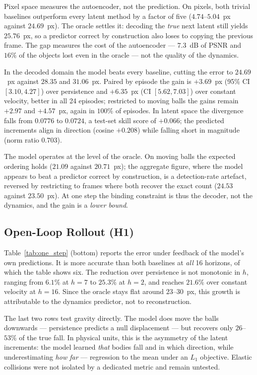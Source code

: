 \documentclass[conference]{IEEEtran}
\begin{document}
Pixel space measures the autoencoder, not the prediction. On pixels, both trivial baselines outperform every latent method by a factor of five ($4.74$--$5.04$~px against $24.69$~px). The oracle settles it: decoding the \emph{true} next latent still yields $25.76$~px, so a predictor correct by construction also loses to copying the previous frame. The gap measures the cost of the autoencoder --- $7.3$~dB of PSNR and $16\%$ of the objects lost even in the oracle --- not the quality of the dynamics.

In the decoded domain the model beats every baseline, cutting the error to $24.69$~px against $28.35$ and $31.06$~px. Paired by episode the gain is $+3.69$~px (95\% CI $[3.10, 4.27]$) over persistence and $+6.35$~px (CI $[5.62, 7.03]$) over constant velocity, better in all 24 episodes; restricted to moving balls the gains remain $+2.97$ and $+4.57$~px, again in $100\%$ of episodes. In latent space the divergence falls from $0.0776$ to $0.0724$, a test-set skill score of $+0.066$; the predicted increments align in direction (cosine $+0.208$) while falling short in magnitude (norm ratio $0.703$).

The model operates at the level of the oracle. On moving balls the expected ordering holds ($21.09$ against $20.71$~px); the aggregate figure, where the model appears to beat a predictor correct by construction, is a detection-rate artefact, reversed by restricting to frames where both recover the exact count ($24.53$ against $23.50$~px). At one step the binding constraint is thus the decoder, not the dynamics, and the gain is a \emph{lower bound}.

\subsection{Open-Loop Rollout (H1)}

Table~\ref{tab:one_step} (bottom) reports the error under feedback of the model's own predictions. It is more accurate than both baselines at \emph{all} 16 horizons, of which the table shows six. The reduction over persistence is not monotonic in $h$, ranging from $6.1\%$ at $h = 7$ to $25.3\%$ at $h = 2$, and reaches $21.6\%$ over constant velocity at $h = 16$. Since the oracle stays flat around $23$--$30$~px, this growth is attributable to the dynamics predictor, not to reconstruction.

The last two rows test gravity directly. The model does move the balls downwards --- persistence predicts a null displacement --- but recovers only $26$--$53\%$ of the true fall. In physical units, this is the asymmetry of the latent increments: the model learned \emph{that} bodies fall and in which direction, while underestimating \emph{how far} --- regression to the mean under an $L_1$ objective. Elastic collisions were not isolated by a dedicated metric and remain untested.
\end{document}
